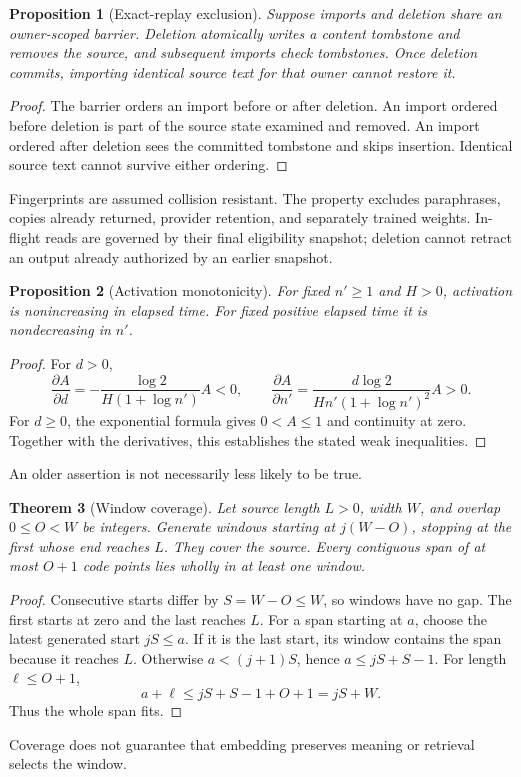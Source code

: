 \documentclass[11pt]{article}
\newtheorem{theorem}{Theorem}
\newtheorem{proposition}[theorem]{Proposition}
\begin{document}
\begin{proposition}[Exact-replay exclusion]
Suppose imports and deletion share an owner-scoped barrier. Deletion atomically writes a content tombstone and removes the source, and subsequent imports check tombstones. Once deletion commits, importing identical source text for that owner cannot restore it.
\end{proposition}
\begin{proof}
The barrier orders an import before or after deletion. An import ordered before deletion is part of the source state examined and removed. An import ordered after deletion sees the committed tombstone and skips insertion. Identical source text cannot survive either ordering.
\end{proof}
Fingerprints are assumed collision resistant. The property excludes paraphrases, copies already returned, provider retention, and separately trained weights. In-flight reads are governed by their final eligibility snapshot; deletion cannot retract an output already authorized by an earlier snapshot.

\begin{proposition}[Activation monotonicity]
For fixed $n'\geq1$ and $H>0$, activation is nonincreasing in elapsed time. For fixed positive elapsed time it is nondecreasing in $n'$.
\end{proposition}
\begin{proof}
For $d>0$,
\[
 \frac{\partial A}{\partial d}
 =-\frac{\log2}{H(1+\log n')}A<0,\qquad
 \frac{\partial A}{\partial n'}
 =\frac{d\log2}{Hn'(1+\log n')^2}A>0.
\]
For $d\geq0$, the exponential formula gives $0<A\leq1$ and continuity at zero. Together with the derivatives, this establishes the stated weak inequalities.
\end{proof}
An older assertion is not necessarily less likely to be true.

\begin{theorem}[Window coverage]
Let source length $L>0$, width $W$, and overlap $0\leq O<W$ be integers. Generate windows starting at $j(W-O)$, stopping at the first whose end reaches $L$. They cover the source. Every contiguous span of at most $O+1$ code points lies wholly in at least one window.
\end{theorem}
\begin{proof}
Consecutive starts differ by $S=W-O\leq W$, so windows have no gap. The first starts at zero and the last reaches $L$. For a span starting at $a$, choose the latest generated start $jS\leq a$. If it is the last start, its window contains the span because it reaches $L$. Otherwise $a<(j+1)S$, hence $a\leq jS+S-1$. For length $\ell\leq O+1$,
\[
 a+\ell\leq jS+S-1+O+1=jS+W.
\]
Thus the whole span fits.
\end{proof}
Coverage does not guarantee that embedding preserves meaning or retrieval selects the window.
\end{document}
